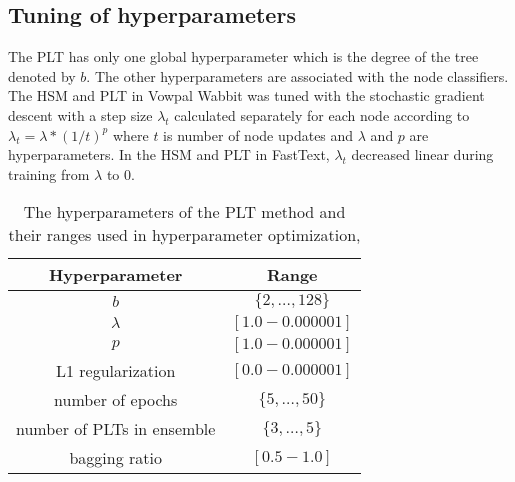 \documentclass{article}
\newcommand{\Algo}[1]{\textsc{#1}}
\newcommand{\tableBefore}{-0pt}
\newcommand{\tableAfter}{-0pt}
\begin{document}
\subsection{Tuning of hyperparameters}
\label{sec:hyper}

The \Algo{PLT} has only one global hyperparameter which is the degree of the tree denoted by $b$.
The other hyperparameters are associated with the node classifiers.
The \Algo{HSM} and \Algo{PLT} in Vowpal Wabbit was tuned with the stochastic gradient descent with a step size $\lambda_t$ calculated separately for each node
according to $\lambda_t = \lambda * (1 / t)^p$ where $t$ is number of node updates and $\lambda$ and $p$ are hyperparameters.
In the \Algo{HSM} and \Algo{PLT} in FastText, $\lambda_t$ decreased linear during training from $\lambda$ to 0.

\vspace{\tableBefore}
\begin{table}[ht!]
\caption{The hyperparameters of the \Algo{PLT} method and their ranges used in hyperparameter optimization,}
\label{tab:hyppar}
\begin{center}
\begin{tabular}{c|c}
\hline
Hyperparameter & Range \\
\hline
$b$ & $\{ 2, \dots , 128\}$ \\
$\lambda$ & $[1.0 - 0.000001]$ \\
$p$ & $[1.0 - 0.000001]$ \\
L1 regularization & $[0.0 - 0.000001]$ \\
number of epochs & $\{ 5, \dots , 50\}$ \\
number of PLTs in ensemble & $\{ 3, \dots , 5\}$ \\
bagging ratio & $[0.5 - 1.0]$ \\
\hline
\end{tabular}
\end{center}
\end{table}
\vspace{\tableAfter}
\end{document}
